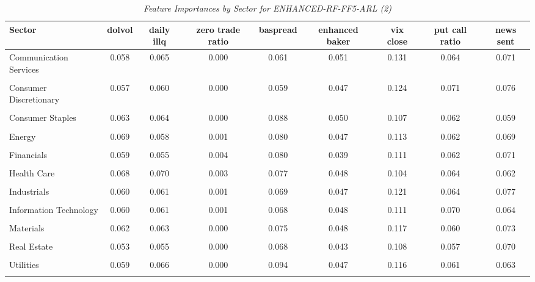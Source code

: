             \begin{table}[ht]
            \centering
            \caption{\textit{Feature Importances by Sector for ENHANCED-RF-FF5-ARL (2)}}
            \label{tab:feature_importance_enhanced-rf-ff5-arl_2}
            \begin{tabular}{lcccccccc}
            \toprule
            Sector & dolvol & daily illq & zero trade ratio & baspread & enhanced baker & vix close & put call ratio & news sent \\
            \midrule
            Communication Services & 0.058 & 0.065 & 0.000 & 0.061 & 0.051 & 0.131 & 0.064 & 0.071 \\\\
Consumer Discretionary & 0.057 & 0.060 & 0.000 & 0.059 & 0.047 & 0.124 & 0.071 & 0.076 \\\\
Consumer Staples & 0.063 & 0.064 & 0.000 & 0.088 & 0.050 & 0.107 & 0.062 & 0.059 \\\\
Energy & 0.069 & 0.058 & 0.001 & 0.080 & 0.047 & 0.113 & 0.062 & 0.069 \\\\
Financials & 0.059 & 0.055 & 0.004 & 0.080 & 0.039 & 0.111 & 0.062 & 0.071 \\\\
Health Care & 0.068 & 0.070 & 0.003 & 0.077 & 0.048 & 0.104 & 0.064 & 0.062 \\\\
Industrials & 0.060 & 0.061 & 0.001 & 0.069 & 0.047 & 0.121 & 0.064 & 0.077 \\\\
Information Technology & 0.060 & 0.061 & 0.001 & 0.068 & 0.048 & 0.111 & 0.070 & 0.064 \\\\
Materials & 0.062 & 0.063 & 0.000 & 0.075 & 0.048 & 0.117 & 0.060 & 0.073 \\\\
Real Estate & 0.053 & 0.055 & 0.000 & 0.068 & 0.043 & 0.108 & 0.057 & 0.070 \\\\
Utilities & 0.059 & 0.066 & 0.000 & 0.094 & 0.047 & 0.116 & 0.061 & 0.063 \\\\
            \bottomrule
            \end{tabular}%
            \end{table}